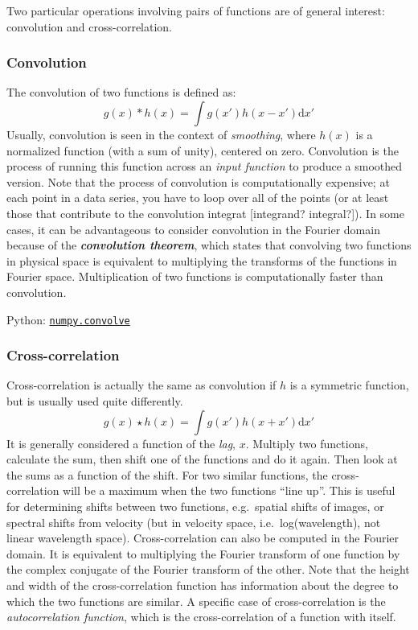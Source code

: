 \documentclass{article}
\begin{document}
Two particular operations involving pairs of functions are of general
interest: convolution and cross-correlation.

\subsubsection{Convolution}
The convolution of two functions is defined as:
\[
    g(x) * h(x) = \int{\! g(x') h(x-x') \mathrm{d}x'}
    \]
Usually, convolution is seen in the context of \textit{smoothing}, where
$h(x)$ is a normalized function (with a sum of unity), centered on zero.
Convolution is the process of running this function across an \textit{input
function} to produce a smoothed version. Note that the process of
convolution is computationally expensive; at each point in a data series,
you have to loop over all of the points (or at least those that contribute
to the convolution integrat [integrand? integral?]). In some cases, it can
be advantageous to consider convolution in the Fourier domain because of
the \textit{\textbf{convolution theorem}}, which states that convolving two
functions in physical space is equivalent to multiplying the transforms of
the functions in Fourier space. Multiplication of two functions is
computationally faster than convolution.

Python:
\href{http://docs.scipy.org/doc/numpy/reference/generated/numpy.convolve.html}
\texttt{numpy.convolve}

\subsubsection{Cross-correlation}
Cross-correlation is actually the same as convolution if $h$
is a symmetric function, but is usually used quite differently.
\[
    g(x) \star h(x) = \int{\! g(x') h(x+x') \mathrm{d}x'}
    \]
It is generally considered a function of the \textit{lag}, $x$. Multiply
two functions, calculate the sum, then shift one of the functions and do it
again. Then look at the sums as a function of the shift. For two similar
functions, the cross-correlation will be a maximum when the two functions
``line up''. This is useful for determining shifts between two functions,
e.g.\ spatial shifts of images, or spectral shifts from velocity (but in
velocity space, i.e.\ log(wavelength), not linear wavelength space).
Cross-correlation can also be computed in the Fourier domain. It is
equivalent to multiplying the Fourier transform of one function by the
complex conjugate of the Fourier transform of the other. Note that the
height and width of the cross-correlation function has information about
the degree to which the two functions are similar. A specific case of
cross-correlation is the \textit{autocorrelation function}, which is the
cross-correlation of a function with itself.
\end{document}

